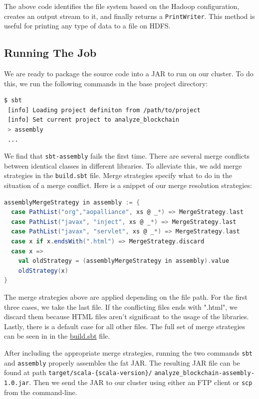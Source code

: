 \documentclass[9pt,twocolumn,twoside]{idsi}
\begin{document}
The above code identifies the file system based on the Hadoop configuration, creates an output stream to it, and finally returns a \lstinline{PrintWriter}. This method is useful for printing any type of data to a file on HDFS.

\subsection{Running The Job}
We are ready to package the source code into a JAR to run on our cluster. To do this, we run the following commands in the base project directory:

\begin{lstlisting}[language=bash]
 $ sbt
 [info] Loading project definiton from /path/to/project
 [info] Set current project to analyze_blockchain
 > assembly
 ...
\end{lstlisting}

We find that \lstinline{sbt-assembly} fails the first time. There are several merge conflicts between identical classes in different libraries. To alleviate this, we add merge strategies in the \lstinline{build.sbt} file. Merge strategies specify what to do in the situation of a merge conflict. Here is a snippet of our merge resolution strategies:

\begin{lstlisting}[language=Scala]
assemblyMergeStrategy in assembly := {
  case PathList("org","aopalliance", xs @ _*) => MergeStrategy.last
  case PathList("javax", "inject", xs @ _*) => MergeStrategy.last
  case PathList("javax", "servlet", xs @ _*) => MergeStrategy.last
  case x if x.endsWith(".html") => MergeStrategy.discard
  case x =>
    val oldStrategy = (assemblyMergeStrategy in assembly).value
    oldStrategy(x)
}
\end{lstlisting}

The merge strategies above are applied depending on the file path. For the first three cases, we take the last file. If the conflicting files ends with ".html", we discard them because HTML files aren't significant to the usage of the libraries. Lastly, there is a default case for all other files. The full set of merge strategies can be seen in in the \href{https://github.com/nishilshah17/idsi_bitcoin/blob/d2f1e0257ff684e99356de052eed1c6868ffe82f/analyze_blockchain/build.sbt#L14}{build.sbt} file.

After including the appropriate merge strategies, running the two commands \lstinline{sbt} and \lstinline{assembly} properly assembles the fat JAR. The resulting JAR file can be found at path \lstinline|target/scala-{scala-version}/| \lstinline|analyze_blockchain-assembly-1.0.jar|. Then we send the JAR to our cluster using either an FTP client or \lstinline{scp} from the command-line.
\end{document}
